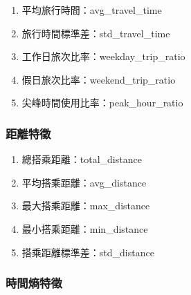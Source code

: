 \begin{enumerate}
\def\labelenumi{\arabic{enumi}.}
\tightlist
\item
  平均旅行時間：avg\_travel\_time
\item
  旅行時間標準差：std\_travel\_time
\item
  工作日旅次比率：weekday\_trip\_ratio
\item
  假日旅次比率：weekend\_trip\_ratio
\item
  尖峰時間使用比率：peak\_hour\_ratio
\end{enumerate}

\subsubsection{距離特徵}\label{ux8dddux96e2ux7279ux5fb5}

\begin{enumerate}
\def\labelenumi{\arabic{enumi}.}
\tightlist
\item
  總搭乘距離：total\_distance
\item
  平均搭乘距離：avg\_distance
\item
  最大搭乘距離：max\_distance
\item
  最小搭乘距離：min\_distance
\item
  搭乘距離標準差：std\_distance
\end{enumerate}

\subsubsection{時間熵特徵}\label{ux6642ux9593ux71b5ux7279ux5fb5}

